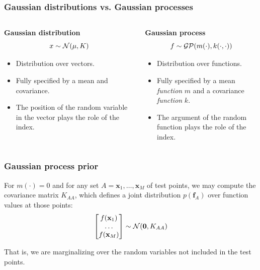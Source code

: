 \documentclass{beamer}
\begin{document}
\begin{frame}
    \frametitle{Gaussian distributions vs. Gaussian processes}

    \begin{columns}[t]
        \begin{column}{0.5\textwidth}
            {\bf Gaussian distribution}
            $$x \sim {\cal N}(\mu, K)$$

            \begin{itemize}
                \item Distribution over vectors.
                \item Fully specified by a mean and covariance.
                \item The position of the random variable in the vector plays the role of the index.
            \end{itemize}

        \end{column}
        \begin{column}{0.5\textwidth}
            {\bf Gaussian process}
            $$f \sim {\cal GP}(m(\cdot), k(\cdot,\cdot))$$

            \begin{itemize}
                \item Distribution over functions.
                \item Fully specified by a mean {\it function} $m$ and a covariance {\it function} $k$.
                \item The argument of the random function plays the role of the index.
            \end{itemize}

        \end{column}
    \end{columns}

\end{frame}


\begin{frame}
    \frametitle{Gaussian process prior}

    For $m(\cdot)=0$ and for any set  $A = \mathbf{x}_1, \dots,
    \mathbf{x}_M$ of test points, we may compute the covariance matrix $K_{AA}$, which defines a joint distribution $p(\mathbf{f}_A)$
    over function values at those points:
    $$\begin{bmatrix} f(\mathbf{x}_1)\\
                      \dots \\
                      f(\mathbf{x}_M) \end{bmatrix} \sim {\cal N}(\mathbf{0}, K_{AA})$$

    That is, we are marginalizing over the random variables not included in the test points.

\end{frame}
\end{document}
